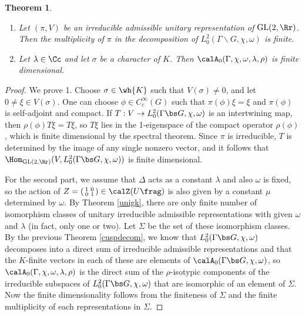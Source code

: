 \documentclass{article}
\newtheorem{theorem}{Theorem}[section]
\newcommand{\GL}{\mathrm{GL}}
\newcommand{\smat}[4]{\left(\begin{smallmatrix} #1 & #2 \\ #3 & #4 \end{smallmatrix}\right)}
\begin{document}
\begin{theorem}
\label{autofin}
\begin{enumerate}
\item Let $(\pi, V)$ be an irreducible admissible unitary representation of $\GL(2, \Rr)$. Then the multiplicity of $\pi$ in the decomposition of $L^{2}_{0}(\Gamma \backslash G, \chi, \omega)$ is finite. 
\item Let $\lambda\in \Cc$ and let $\sigma$ be a character of $K$. Then $\calA_{0}(\Gamma, \chi, \omega, \lambda, \rho)$ is finite dimensional. 
\end{enumerate}
\end{theorem}
\begin{proof}
We prove 1. 
Choose $\sigma \in \wh{K}$ such that $V(\sigma)\neq 0$, and let $0\neq \xi\in V(\sigma)$. 
One can choose $\phi\in C_{c}^{\infty}(G)$ such that $\pi(\phi)\xi = \xi$ and $\pi(\phi)$ is self-adjoint and compact. 
If $T:V\to L_{0}^{2}(\Gamma \bs G, \chi, \omega)$ is an intertwining map, then $\rho(\phi)T\xi = T\xi$, so $T\xi$ lies in the 1-eigenspace of the compact operator $\rho(\phi)$, which is finite dimensional by the spectral theorem. 
Since $\pi$ is irreducible, $T$ is determined by the image of any single nonzero vector, and it follows that $\Hom_{\GL(2, \Rr)}(V, L_{0}^{2}(\Gamma \bs G, \chi, \omega))$ is finite dimensional. 

For the second part, we assume that $\Delta$ acts as a constant $\lambda$ and also $\omega$ is fixed, so the action of  $Z = \smat{1}{0}{0}{1}\in \calZ (U\frag)$ is also given by a constant $\mu$ determined by $\omega$. By Theorem \ref{unigk}, there are only finite number of isomorphism classes of unitary irreducible admissible representations with given $\omega$ and $\lambda$ (in fact, only one or two). 
Let $\Sigma$ be the set of these isomorphism classes. 
By the previous Theorem \ref{cuspdecom}, we know that $L_{0}^{2}(\Gamma \bs G, \chi, \omega)$ decomposes into a direct sum of irreducible admissible representations and that the $K$-finite vectors in each of these are elements of $\calA_{0}(\Gamma \bs G, \chi, \omega)$, so $\calA_{0}(\Gamma, \chi, \omega, \lambda, \rho)$ is the direct sum of the $\rho$-isotypic components of the irreducible subspaces of $L_{0}^{2}(\Gamma \bs G, \chi, \omega)$ that are isomorphic of an element of $\Sigma$. 
Now the finite dimensionality follows from the finiteness of $\Sigma$ and the finite multiplicity of each representations in $\Sigma$. 
\end{proof}
\end{document}
